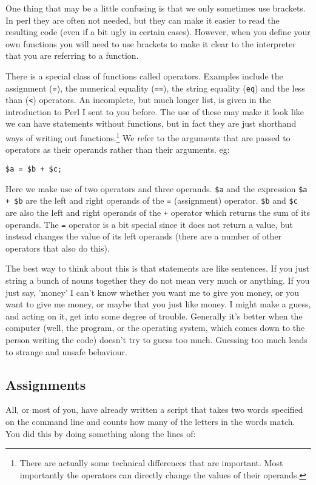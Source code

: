 \documentclass[11pt]{article}
\renewcommand\scriptsize\normalsize
\begin{document}
One thing that may be a little confusing is that we only sometimes use brackets.
In perl they are often not needed, but they can make it easier to read
the resulting code (even if a bit ugly in certain cases). However,
when you define your own functions you will need to use brackets to make it
clear to the interpreter that you are referring to a function. 

There is a special class of functions called operators. Examples include the assignment
(\texttt{=}), the numerical equality (\texttt{==}), the string equality (\texttt{eq}) and
the less than (\texttt{<}) operators. An incomplete, but much longer list, is given in
the introduction to Perl I sent to you before. The use of these may make it look like
we can have statements without functions, but in fact they are just shorthand ways
of writing out functions.\footnote{There are actually some technical differences that
are important. Most importantly the operators can directly change the values of their
operands.} We refer to the arguments that are passed to operators as their operands
rather than their arguments. eg:

\begin{verbatim}
$a = $b + $c;
\end{verbatim}
Here we make use of two operators and three operands. \texttt{\$a} and the expression \texttt{\$a + \$b} are
the left and right operands of the \texttt{=} (assignment) operator.
\texttt{\$b} and \texttt{\$c} are also the left and right operands of the \texttt{+} operator
which returns the sum of its operands. The \texttt{=} operator is a bit special since it
does not return a value, but instead changes the value of its left operands (there are
a number of other operators that also do this).

The best way to think about this is that statements are like sentences. If you just string
a bunch of nouns together they do not mean very much or anything. If you just say, 'money'
I can't know whether you want me to give you money, or you want to give me money, or maybe
that you just like money. I might make a guess, and acting on it, get into some degree of
trouble. Generally it's better when the computer (well, the program, or the operating system, which
comes down to the person writing the code) doesn't try to guess too much. Guessing too much
leads to strange and unsafe behaviour.

\subsection{Assignments}
\label{sec-1-3}
All, or most of you, have already written a script that takes two words specified
on the command line and counts how many of the letters in the words match.
You did this by doing something along the lines of:
\end{document}
